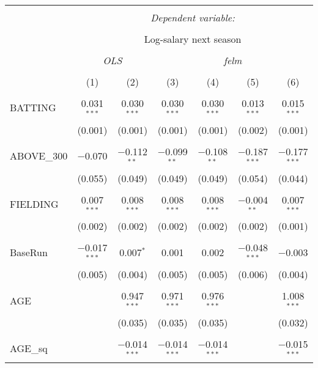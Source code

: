 
\begin{table}[!htbp] \centering
  \caption{}
  \label{}
  \scriptsize
\begin{tabular}{@{\extracolsep{5pt}}lcccccc}
\\[-1.8ex]\hline
\hline \\[-1.8ex]
 & \multicolumn{6}{c}{\textit{Dependent variable:}} \\
\cline{2-7}
\\[-1.8ex] & \multicolumn{6}{c}{Log-salary next season} \\
\\[-1.8ex] & \multicolumn{2}{c}{\textit{OLS}} & \multicolumn{4}{c}{\textit{felm}} \\
\\[-1.8ex] & (1) & (2) & (3) & (4) & (5) & (6)\\
\hline \\[-1.8ex]
 BATTING & 0.031$^{***}$ & 0.030$^{***}$ & 0.030$^{***}$ & 0.030$^{***}$ & 0.013$^{***}$ & 0.015$^{***}$ \\
  & (0.001) & (0.001) & (0.001) & (0.001) & (0.002) & (0.001) \\
  & & & & & & \\
 ABOVE\_300 & $-$0.070 & $-$0.112$^{**}$ & $-$0.099$^{**}$ & $-$0.108$^{**}$ & $-$0.187$^{***}$ & $-$0.177$^{***}$ \\
  & (0.055) & (0.049) & (0.049) & (0.049) & (0.054) & (0.044) \\
  & & & & & & \\
 FIELDING & 0.007$^{***}$ & 0.008$^{***}$ & 0.008$^{***}$ & 0.008$^{***}$ & $-$0.004$^{**}$ & 0.007$^{***}$ \\
  & (0.002) & (0.002) & (0.002) & (0.002) & (0.002) & (0.001) \\
  & & & & & & \\
 BaseRun & $-$0.017$^{***}$ & 0.007$^{*}$ & 0.001 & 0.002 & $-$0.048$^{***}$ & $-$0.003 \\
  & (0.005) & (0.004) & (0.005) & (0.005) & (0.006) & (0.004) \\
  & & & & & & \\
 AGE &  & 0.947$^{***}$ & 0.971$^{***}$ & 0.976$^{***}$ &  & 1.008$^{***}$ \\
  &  & (0.035) & (0.035) & (0.035) &  & (0.032) \\
  & & & & & & \\
 AGE\_sq &  & $-$0.014$^{***}$ & $-$0.014$^{***}$ & $-$0.014$^{***}$ &  & $-$0.015$^{***}$ \\

\end{tabular}
\end{table}
